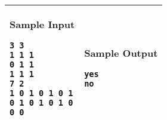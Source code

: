 \begin{table}[!h]
\centering
\begin{tabular}{|l|l|}
\hline
\begin{minipage}[t]{3in}
\textbf{Sample Input}
\begin{verbatim}
3 3
1 1 1
0 1 1
1 1 1
7 2
1 0 1 0 1 0 1
0 1 0 1 0 1 0
0 0
\end{verbatim}
\vspace{1mm}
\end{minipage}
&

\begin{minipage}[t]{3in}
\textbf{Sample Output}
\begin{verbatim}
yes
no
\end{verbatim}
\vspace{1mm}
\end{minipage} \\
\hline
\end{tabular}
\end{table}

\newpage
